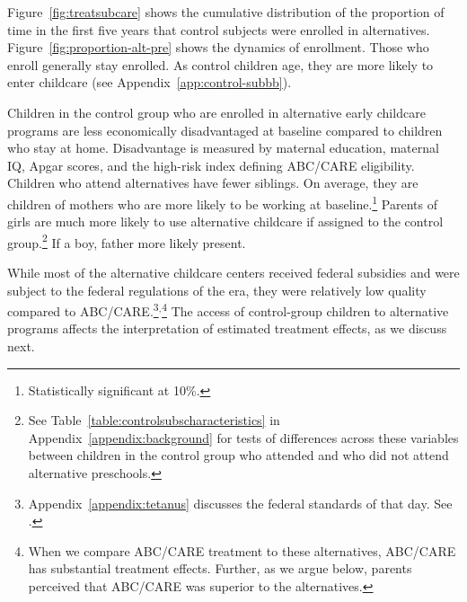 Figure~\ref{fig:treatsubcare} shows the cumulative distribution of the proportion of time in the first five years that control subjects were enrolled in alternatives. Figure~\ref{fig:proportion-alt-pre} shows the dynamics of enrollment. Those who enroll generally stay enrolled. As control children age, they are more likely to enter childcare (see Appendix~\ref{app:control-subbb}).

Children in the control group who are enrolled in alternative early childcare programs are less economically disadvantaged at baseline compared to children who stay at home. Disadvantage is measured by maternal education, maternal IQ, Apgar scores, and the high-risk index defining ABC/CARE eligibility. Children who attend alternatives have fewer siblings. On average, they are children of mothers who are more likely to be working at baseline.\footnote{Statistically significant at 10\%.} Parents of girls are much more likely to use alternative childcare if assigned to the control group.\footnote{See Table~\ref{table:controlsubscharacteristics} in Appendix~\ref{appendix:background} for tests of differences across these variables between children in the control group who attended and who did not attend alternative preschools.} If a boy, father more likely present.

While most of the alternative childcare centers received federal subsidies and were subject to the federal regulations of the era, they were relatively low quality compared to ABC/CARE.\footnote{Appendix~\ref{appendix:tetanus} discusses the federal standards of that day. See \citet{Department-of-Health_1968_DayCareRequirements,NCGA_1971_House-Bill-100,Ramey-et-al_1977_Intro-to-ABC,Ramey_Campbell_1979_SR,Ramey_McGinness_etal_1982_Abecedarianapproach, Burchinal_Campbell_etal_1997_CD}.}$^,$\footnote{When we compare ABC/CARE treatment to these alternatives, ABC/CARE has substantial treatment effects. Further, as we argue below, parents perceived that ABC/CARE was superior to the alternatives.} The access of control-group children to alternative programs affects the interpretation of estimated treatment effects, as we discuss next.
